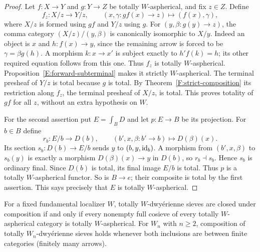 \begin{proof}
Let $f:X\to Y$ and $g:Y\to Z$ be totally
$W$-aspherical, and fix $z\in Z$. Define
\[
 f_z:X/z\longrightarrow Y/z,
 \qquad (x,\gamma:gf(x)\to z)\longmapsto(f(x),\gamma),
\]
where $X/z$ is formed using $gf$ and $Y/z$ using $g$.
For $(y,\beta:g(y)\to z)$, the comma category
$(X/z)/(y,\beta)$ is canonically isomorphic to $X/y$.
Indeed an object is $x$ and $h:f(x)\to y$, since the
remaining arrow is forced to be $\gamma=\beta g(h)$.
A morphism $k:x\to x'$ is subject exactly to
$h'f(k)=h$; its other required equation follows from
this one. Thus $f_z$ is totally $W$-aspherical.
Proposition~\ref{E:forward-subterminal} makes it strictly
$W$-aspherical. The terminal presheaf of $Y/z$ is total
because $g$ is total. By Theorem~\ref{F:strict-composition}
its restriction along $f_z$, the terminal presheaf of
$X/z$, is total. This proves totality of $gf$ for all
$z$, without an extra hypothesis on $W$.

For the second assertion put $E=\int_BD$ and let
$p:E\to B$ be its projection. For $b\in B$ define
\[
 r_b:E/b\to D(b),\qquad
 (b',x,\beta:b'\to b)\longmapsto D(\beta)(x).
\]
Its section $s_b:D(b)\to E/b$ sends $y$ to
$(b,y,\mathrm{id}_b)$. A morphism from $(b',x,\beta)$ to
$s_b(y)$ is exactly a morphism $D(\beta)(x)\to y$
in $D(b)$, so $r_b\dashv s_b$. Hence $s_b$ is
ordinary final. Since $D(b)$ is total, its final
image $E/b$ is total. Thus $p$ is a totally
$W$-aspherical functor. So is $B\to e$; their
composite is total by the first assertion. This
says precisely that $E$ is totally $W$-aspherical.
\end{proof}

\begin{theorem}\label{F:total-sieve-cosieves}
For a fixed fundamental localizer $W$, totally
$W$-dwy\'erienne sieves are closed under composition
if and only if every nonempty full cosieve of every
totally $W$-aspherical category is totally
$W$-aspherical. For $W_n$ with $n\geq2$, composition
of totally $W_n$-dwy\'erienne sieves holds whenever
both inclusions are between finite categories
(finitely many arrows).
\end{theorem}

